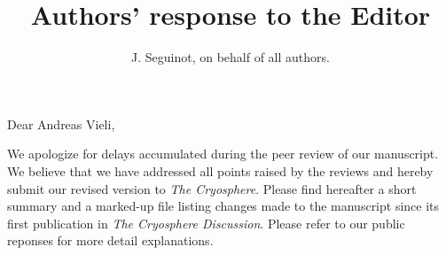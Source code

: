 

\title{Authors' response to the Editor}
\author{J. Seguinot, on behalf of all authors.}


\thispagestyle{empty}
\maketitle
\bigskip


    Dear Andreas Vieli,

    We apologize for delays accumulated during the peer review of our
    manuscript. We believe that we have addressed all points raised by the
    reviews and hereby submit our revised version to \emph{The Cryosphere}.
    Please find hereafter a short summary and a marked-up file listing
    changes made to the manuscript since its first publication in \emph{The
    Cryosphere Discussion}. Please refer to our public reponses for more
    detail explanations.

